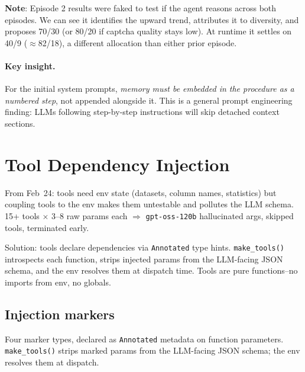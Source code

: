 \noindent \textbf{Note}: Episode 2 results were faked to test if the agent reasons across both episodes. We can see it identifies the upward trend, attributes it to diversity, and proposes 70/30 (or 80/20 if captcha quality stays low).
At runtime it settles on 40/9 ($\approx$82/18), a different allocation than either prior episode.

\paragraph{Key insight.} For the initial system prompts, \emph{memory must be embedded in the procedure as a numbered step}, not appended alongside it.
This is a general prompt engineering finding: LLMs following step-by-step instructions will skip detached context sections.

\newpage
\section{Tool Dependency Injection}
\label{sec:injection}

From Feb~24: tools need env state (datasets, column names, statistics) but coupling tools to the env makes them untestable and pollutes the LLM schema.
15+ tools $\times$ 3--8 raw params each $\Rightarrow$ \texttt{gpt-oss-120b} hallucinated args, skipped tools, terminated early.

Solution: tools declare dependencies via \texttt{Annotated} type hints.
\texttt{make\_tools()} introspects each function, strips injected params from the LLM-facing JSON schema, and the env resolves them at dispatch time.
Tools are pure functions--no imports from env, no globals.

\subsection{Injection markers}

Four marker types, declared as \texttt{Annotated} metadata on function parameters.
\texttt{make\_tools()} strips marked params from the LLM-facing JSON schema; the env resolves them at dispatch.


